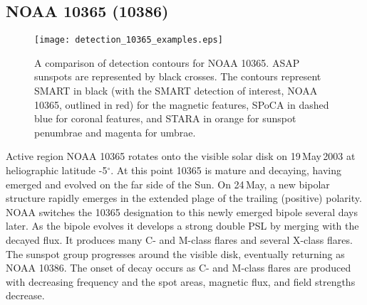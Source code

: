 {\subsection{NOAA 10365 (10386)}\label{noaa_10365}

\begin{figure}[!t]
\centerline{\texttt{[image: detection\_10365\_examples.eps]}}
\caption[NOAA 10365 detection contours.]{A comparison of detection contours for NOAA 10365. ASAP sunspots are represented by black crosses. The contours represent SMART in black (with the SMART detection of interest, NOAA 10365, outlined in red) for the magnetic features, SPoCA in dashed blue for coronal features, and STARA in orange for sunspot penumbrae and magenta for
umbrae.}
\label{detection10365compare}
\end{figure}

Active region NOAA 10365 rotates onto the visible solar disk on 19\,May\,2003 at
heliographic latitude -5$^{\circ}$. At this point 10365 is mature and decaying,
having emerged and evolved on the far side of the Sun. On 24\,May, a new
bipolar structure rapidly emerges in the extended plage of the trailing
(positive) polarity. \gls{NOAA} switches the 10365 designation to this newly emerged
bipole several days later. As the bipole evolves it develops a strong double \gls{PSL}
by merging with the decayed flux. It produces many C- and M-class flares
and several X-class flares. The sunspot group progresses around the visible disk,
eventually returning as NOAA 10386. The onset of decay occurs as C- and M-class
flares are produced with decreasing frequency and the spot areas, magnetic flux,
and field strengths decrease.

}
